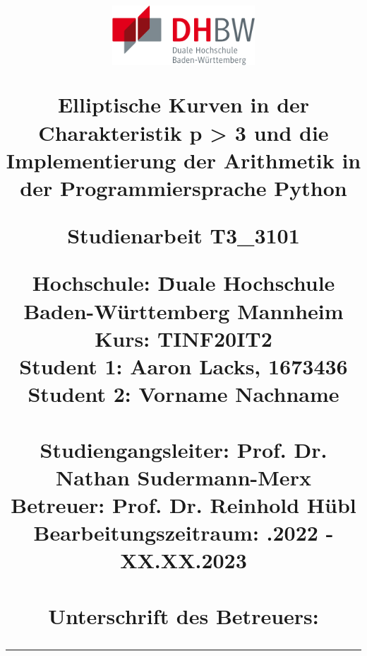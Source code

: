 \begin{titlepage}
\centering
\title{		
	\includegraphics[width=0.4\textwidth]{grafiken/dhbw.png}\\       		 
	\vspace{1.0cm}
          
    \begin{singlespacing}
    {\Large Elliptische Kurven in der Charakteristik p > 3 und die Implementierung der Arithmetik in der Programmiersprache Python}	\\
    \vspace{1.8cm}	
    \begin{normalfont}
	{\large Studienarbeit T3\_3101}
	\end{normalfont}
    \vspace{1.8cm}
    \begin{onehalfspacing}
    \begin{normalsize}
	\begin{normalfont}
	\begin{tabbing}
	Hochschule: \hspace{2.7cm} \= Duale Hochschule Baden-Württemberg Mannheim\\
	Kurs: \> TINF20IT2\\	
	Student 1: \> Aaron Lacks, 1673436\\
	Student 2: \> Vorname Nachname\\		
	\vspace{1.0cm}\\
	Studiengangsleiter:  \> Prof. Dr. Nathan Sudermann-Merx\\
	Betreuer: \> Prof. Dr. Reinhold Hübl\\	
	Bearbeitungszeitraum: .2022 - XX.XX.2023\\	
	\vspace{1.0cm}\\
	Unterschrift des Betreuers: \> {\rule{6cm}{1pt}}\\
	\end{tabbing}
	\end{normalfont}
	\end{normalsize}
	\end{onehalfspacing}
	\end{singlespacing}	
}
\author{}
\date{} 
\maketitle		
\end{titlepage}